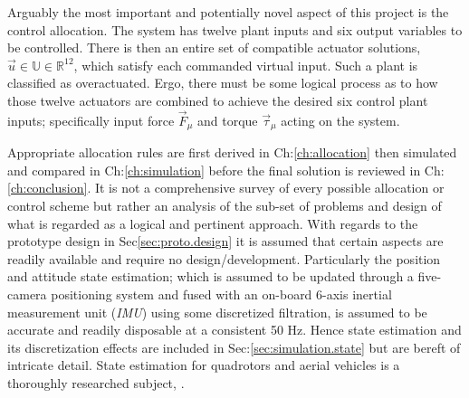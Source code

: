 \par
Arguably the most important and potentially novel aspect of this project is the control allocation. The system has twelve plant inputs and six output variables to be controlled. There is then an entire set of compatible actuator solutions, $\vec{u}\in\mathbb{U}\in\mathbb{R}^{12}$, which satisfy each commanded virtual input. Such a plant is classified as overactuated. Ergo, there must be some logical process as to how those twelve actuators are combined to achieve the desired six control plant inputs; specifically input force $\vec{F}_{\mu}$ and torque $\vec{\tau}_{\mu}$ acting on the system.
\par
Appropriate allocation rules are first derived in Ch:\ref{ch:allocation} then simulated and compared in Ch:\ref{ch:simulation} before the final solution is reviewed in Ch:\ref{ch:conclusion}. It is not a comprehensive survey of every possible allocation or control scheme but rather an analysis of the sub-set of problems and design of what is regarded as a logical and pertinent approach. With regards to the prototype design in Sec\ref{sec:proto.design} it is assumed that certain aspects are readily available and require no design/development. Particularly the position and attitude state estimation; which is assumed to be updated through a five-camera positioning system and fused with an on-board 6-axis inertial measurement unit (\emph{IMU}) using some discretized filtration, is assumed to be accurate and readily disposable at a consistent 50 Hz. Hence state estimation and its discretization effects are included in Sec:\ref{sec:simulation.state} but are bereft of intricate detail. State estimation for quadrotors and aerial vehicles is a thoroughly researched subject, \cite{arnold,spacecraftkalman,attitudedetermination}.
